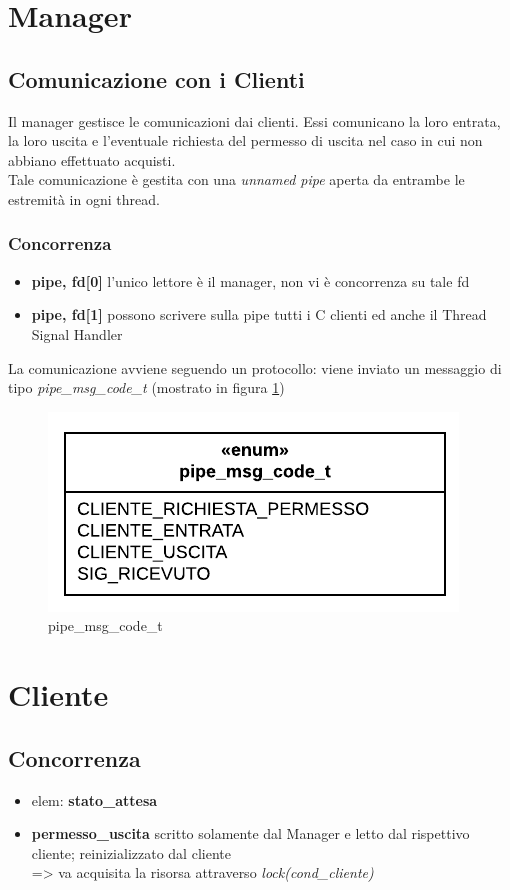 \documentclass[11pt, a4paper]{article}
\begin{document}
\section{Manager}
\subsection{Comunicazione con i Clienti}
Il manager gestisce le comunicazioni dai clienti. Essi comunicano la loro entrata, la loro uscita e l'eventuale richiesta del permesso di uscita nel caso in cui non abbiano effettuato acquisti.\\
Tale comunicazione è gestita con una \textit{unnamed pipe} aperta da entrambe le estremità in ogni thread. 
\subsubsection{Concorrenza}
\begin{itemize}
\item \textbf{pipe, fd[0]} l'unico lettore è il manager, non vi è concorrenza su tale fd
\item \textbf{pipe, fd[1]} possono scrivere sulla pipe tutti i C clienti ed anche il Thread Signal Handler
\end{itemize}
La comunicazione avviene seguendo un protocollo: viene inviato un messaggio di tipo \textit{pipe\_msg\_code\_t} (mostrato in figura \ref{fig:pipemsg})
\begin{figure}[h]
	\centering
	\includegraphics[scale=0.8]{pipemsg.png}
	\caption{pipe\_msg\_code\_t}
	\label{fig:pipemsg}
\end{figure}


\section{Cliente}

\subsection{Concorrenza}
\begin{itemize}
\item elem: \textbf{stato\_attesa}
\item \textbf{permesso\_uscita} scritto solamente dal Manager e letto dal rispettivo cliente; reinizializzato dal cliente\\
=> \hspace{10mm} va acquisita la risorsa attraverso \textit{lock(cond\_cliente)} 

\end{itemize}
\end{document}
